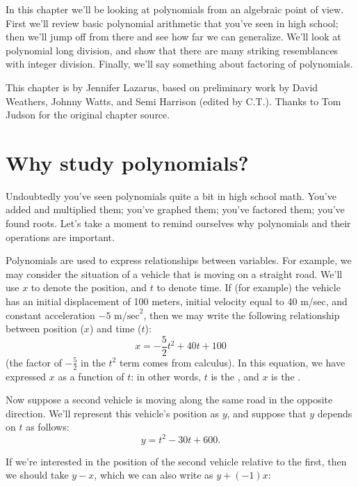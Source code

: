 
 

 In this chapter we'll be looking at  polynomials from an algebraic point of view. First we'll review basic  polynomial arithmetic that you've seen in high school; then we'll jump off from there and see how far we can generalize. We'll look at polynomial long division, and show that there are many striking resemblances with integer division. Finally, we'll say something about factoring of polynomials.
\bigskip

This chapter is by Jennifer Lazarus, based on preliminary work by David Weathers, Johnny Watts, and Semi Harrison (edited by C.T.). Thanks to Tom Judson for the original chapter source.

\section{Why study polynomials?}
\label{sec:Polynomials:WhyStudyPolynomials}
Undoubtedly you've seen polynomials quite a bit in high school math. You've added and multiplied them; you've graphed them; you've factored them; you've found roots. Let's take a moment to remind ourselves why polynomials and their operations are important.	

Polynomials are used to express relationships between variables. For example, we may consider the situation  of a vehicle that is moving on a straight road. We'll use $x$ to denote the position, and $t$ to denote time.   If (for example) the vehicle has an initial displacement of 100 meters, initial velocity equal to 40 m/sec, and constant acceleration $-5$ $\text{m/sec}^2$, then we may write the following relationship between position ($x$) and time ($t$):
$$ x =  -\frac{5}{2} t^2+ 40t + 100$$
(the factor of $-\frac{5}{2}$ in the $t^2$ term comes from calculus). In this equation, we have expressed $x$ as a function of $t$: in other words, $t$ is the , and $x$ is the .

Now suppose a second vehicle is moving along the same road  in the opposite direction. We'll represent this vehicle's position as $y$, and suppose that $y$ depends on $t$ as follows:
$$ y =   t^2- 30t + 600.$$

If we're interested in the position of the second vehicle relative to the first, then we should take $y - x$, which we can also write as $y + (-1)x$:

